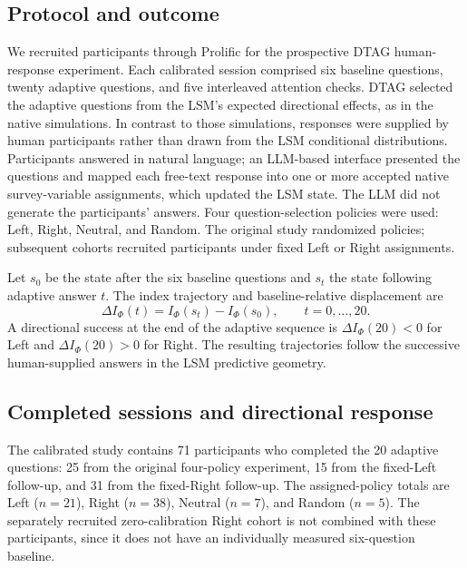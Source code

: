 \subsection{Protocol and outcome}
We recruited participants through Prolific for the prospective DTAG
human-response experiment. Each calibrated session comprised six
baseline questions, twenty adaptive questions, and five interleaved
attention checks. DTAG selected the adaptive questions from the LSM's
expected directional effects, as in the native simulations. In contrast
to those simulations, responses were supplied by human participants
rather than drawn from the LSM conditional distributions. Participants
answered in natural language; an LLM-based interface presented the
questions and mapped each free-text response into one or more accepted
native survey-variable assignments, which updated the LSM state.
The LLM did not generate the participants' answers. Four
question-selection policies were used: Left, Right, Neutral, and Random.
The original study randomized policies; subsequent cohorts recruited
participants under fixed Left or Right assignments.

Let $s_0$ be the state after the six baseline questions and $s_t$
the state following adaptive answer $t$. The index trajectory and
baseline-relative displacement are
\begin{equation}
\Delta I_\Phi(t)=I_\Phi(s_t)-I_\Phi(s_0),
\qquad t=0,\ldots,20.
\label{eq:humanstudy-new-delta}
\end{equation}
A directional success at the end of the adaptive sequence is
$\Delta I_\Phi(20)<0$ for Left and $\Delta I_\Phi(20)>0$ for Right.
The resulting trajectories follow the successive human-supplied
answers in the LSM predictive geometry.

\subsection{Completed sessions and directional response}
The calibrated study contains 71 participants who completed
the 20 adaptive questions: 25 from the original four-policy
experiment, 15 from the fixed-Left follow-up, and 31 from the
fixed-Right follow-up. The assigned-policy totals are Left
($n=21$), Right ($n=38$), Neutral ($n=7$), and Random ($n=5$).
The separately recruited zero-calibration Right cohort is not
combined with these participants, since it does not have an
individually measured six-question baseline.

